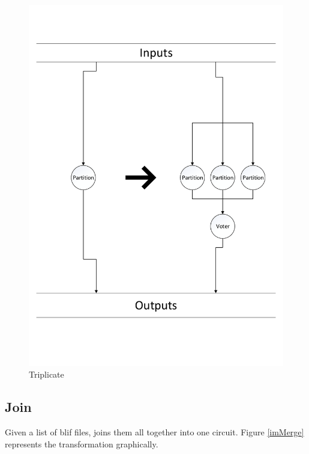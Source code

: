 \documentclass[12pt,final,oneside]{dwThesis} %
\begin{document}
   \begin{figure}

      \begin{center}

         \includegraphics[width=\linewidth]{images/Triplicate.pdf}
         \caption{Triplicate} \label{imTriplicate} 
      \end{center}

   \end{figure}

   \newpage 
   \subsection{Join}
   \label{algJoin} Given a list of blif files,
   joins them all together into one circuit.
   Figure \ref{imMerge} represents the transformation graphically.
   
\end{document}
